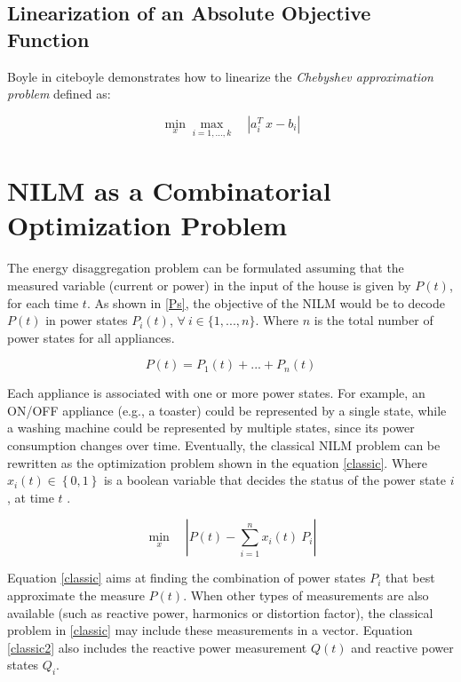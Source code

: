 \subsection{Linearization of an Absolute Objective Function}
Boyle in cite{boyle} demonstrates how to linearize the \textit{Chebyshev approximation problem} defined as:

\begin{equation} \label{chebyshev}
    \min_{x} \max_{i=1,...,k} \quad \left| a_i^T\ x - b_i \right |
\end{equation}


\section{NILM as a Combinatorial Optimization Problem}

The energy disaggregation problem can be formulated assuming that the measured variable (current or power) in the input of the house is given by $P(t)$, for each time $t$. As shown in \eqref{Ps}, the objective of the NILM would be to decode $P(t)$ in power states $P_i(t)$, $\forall \ i \in \{1,...,n\}$. Where $n$ is the total number of power states for all appliances. 

\begin{equation} \label{Ps}
    P(t) = P_1(t) + ... + P_n(t)
\end{equation}
 
Each appliance is associated with one or more power states. For example, an ON/OFF appliance (e.g., a toaster) could be represented by a single state, while a washing machine could be represented by multiple states, since its power consumption changes over time. 
Eventually, the classical NILM problem can be rewritten as the optimization problem shown in the equation \eqref{classic}. Where $x_i(t) \in \left\{ 0 , 1 \right\}$ is a boolean variable that decides the status of the power state $i$, at time $t$ \cite{hart}.

\begin{equation} \label{classic}
    \min_{x} \quad \left| P(t) - \sum_{i=1}^{n} x_i(t)\ P_i \right |
\end{equation}

Equation \eqref{classic} aims at finding the combination of power states $P_i$ that best approximate the measure $P(t)$. When other types of measurements are also available (such as reactive power, harmonics or distortion factor), the classical problem in \eqref{classic} may include these measurements in a vector. Equation \eqref{classic2} also includes the reactive power measurement $Q(t)$ and reactive power states $Q_i$. 

